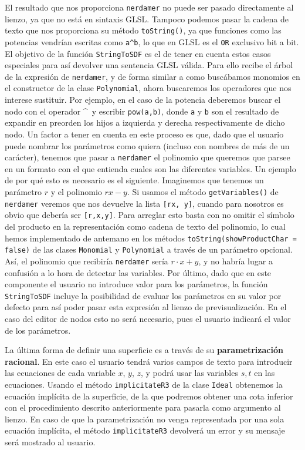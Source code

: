 El resultado que nos proporciona \texttt{nerdamer} no puede ser pasado directamente al lienzo, ya que no está en sintaxis GLSL. Tampoco podemos pasar la cadena de texto que nos proporciona su método \texttt{toString()}, ya que funciones como las potencias vendrían escritas como \texttt{a\textasciicircum b}, lo que en GLSL es el \texttt{OR} exclusivo bit a bit. El objetivo de la función \texttt{StringToSDF} es el de tener en cuenta estos casos especiales para así devolver una sentencia GLSL válida. Para ello recibe el árbol de la expresión de \texttt{nerdamer}, y de forma similar a como buscábamos monomios en el constructor de la clase \texttt{Polynomial}, ahora buscaremos los operadores que nos interese sustituir. Por ejemplo, en el caso de la potencia deberemos buscar el nodo con el operador \textasciicircum\ y escribir \texttt{pow(a,b)}, donde \texttt{a} y \texttt{b} son el resultado de expandir en preorden los hijos a izquierda y derecha respectivamente de dicho nodo. Un factor a tener en cuenta en este proceso es que, dado que el usuario puede nombrar los parámetros como quiera (incluso con nombres de más de un carácter), tenemos que pasar a \texttt{nerdamer} el polinomio que queremos que parsee en un formato con el que entienda cuales son las diferentes variables. Un ejemplo de por qué esto es necesario es el siguiente. Imaginemos que tenemos un parámetro $r$ y el polinomio $rx -y$. Si usamos el método \texttt{getVariables()} de \texttt{nerdamer} veremos que nos devuelve la lista \texttt{[rx, y]}, cuando para nosotros es obvio que debería ser \texttt{[r,x,y]}. Para arreglar esto basta con no omitir el símbolo del producto en la representación como cadena de texto del polinomio, lo cual hemos implementado de antemano en los métodos \texttt{toString(showProductChar = false)} de las clases \texttt{Monomial} y \texttt{Polynomial} a través de un parámetro opcional. Así, el polinomio que recibiría \texttt{nerdamer} sería $r\cdot x + y$, y no habría lugar a confusión a lo hora de detectar las variables. Por último, dado que en este componente el usuario no introduce valor para los parámetros, la función \texttt{StringToSDF} incluye la posibilidad de evaluar los parámetros en su valor por defecto para así poder pasar esta expresión al lienzo de previsualización. En el caso del editor de nodos esto no será necesario, pues el usuario indicará el valor de los parámetros.\newline

La última forma de definir una superficie es a través de su \textbf{parametrización racional}. En este caso el usuario tendrá varios campos de texto para introducir las ecuaciones de cada variable $x$, $y$, $z$, y podrá usar las variables $s,t$ en las ecuaciones. Usando el método \texttt{implicitateR3} de la clase \texttt{Ideal} 
obtenemos la ecuación implícita de la superficie, de la que podremos obtener una cota inferior con el procedimiento descrito anteriormente para pasarla como argumento al lienzo. En caso de que la parametrización no venga representada por una sola ecuación implícita, el método \texttt{implicitateR3} devolverá un error y su mensaje será mostrado al usuario.\newline

